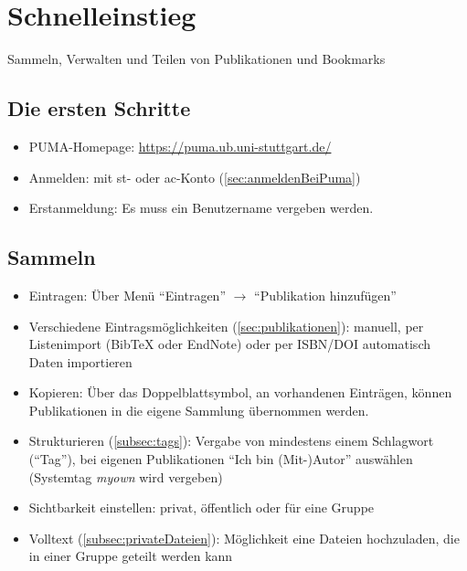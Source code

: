 \chapter{Schnelleinstieg}
\label{ch:schnelleinstieg}
Sammeln, Verwalten und Teilen von Publikationen und Bookmarks

\section{Die ersten Schritte}
\label{sec:ersteSchritte}
\begin{itemize}
\item PUMA-Homepage: \url{https://puma.ub.uni-stuttgart.de/}
\item Anmelden: mit st- oder ac-Konto (\autoref{sec:anmeldenBeiPuma})
\item Erstanmeldung: Es muss ein Benutzername vergeben werden.
\end{itemize}

\section{Sammeln}
\label{sec:sammeln}
\begin{itemize}
\item Eintragen: Über Menü \enquote{Eintragen} $\to$ \enquote{Publikation hinzufügen}
\item Verschiedene Eintragsmöglichkeiten (\autoref{sec:publikationen}): manuell, per Listenimport (BibTeX oder EndNote) oder per ISBN/DOI automatisch Daten importieren
\item Kopieren: Über das Doppelblattsymbol, an vorhandenen Einträgen, können Publikationen in die eigene Sammlung übernommen werden. 
\item Strukturieren (\autoref{subsec:tags}): Vergabe von mindestens einem Schlagwort (\enquote{Tag}), bei eigenen Publikationen \enquote{Ich bin (Mit-)Autor} auswählen (Systemtag \textit{myown} wird vergeben) 
\item Sichtbarkeit einstellen: privat, öffentlich oder für eine Gruppe
\item Volltext (\autoref{subsec:privateDateien}): Möglichkeit eine Dateien hochzuladen, die in einer Gruppe geteilt werden kann
\end{itemize}

